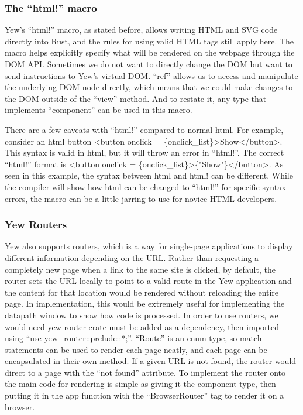 \documentclass[
    parskip=half,
    fontsize=12pt,
    titlepage=firstiscover,
    toc=bibliography,
    numbers=endperiod
]{scrartcl}
\begin{document}
\subsubsection{The ``html!'' macro}
\label{subsec:html-macro}

Yew's ``html!'' macro, as stated before, allows writing HTML and SVG
code directly into Rust, and the rules for using valid HTML tags still
apply here. The macro helps explicitly specify what will be rendered on
the webpage through the DOM API. Sometimes we do not want to directly
change the DOM but want to send instructions to Yew's virtual DOM.
``ref'' allows us to access and manipulate the underlying DOM node
directly, which means that we could make changes to the DOM outside of
the ``view'' method. And to restate it, any type that implements
``component'' can be used in this macro.

There are a few caveats with ``html!'' compared to normal html. For
example, consider an html button \textless button onclick =
\{onclick\_list\}\textgreater Show\textless/button\textgreater. This
syntax is valid in html, but it will throw an error in ``html!''. The
correct ``html!'' format is \textless button onclick =
\{onclick\_list\}\textgreater\{"Show"\}\textless/button\textgreater. As
seen in this example, the syntax between html and html! can be
different. While the compiler will show how html can be changed to
``html!'' for specific syntax errors, the macro can be a little jarring
to use for novice HTML developers.

\subsubsection{Yew Routers}

Yew also supports routers, which is a way for single-page applications
to display different information depending on the URL. Rather than
requesting a completely new page when a link to the same site is
clicked, by default, the router sets the URL locally to point to a valid
route in the Yew application and the content for that location would be
rendered without reloading the entire page. In implementation, this
would be extremely useful for implementing the datapath window to show
how code is processed. In order to use routers, we would need yew-router
crate must be added as a dependency, then imported using ``use
yew\_router::prelude::*;''. ``Route'' is an enum type, so match
statements can be used to render each page neatly, and each page can be
encapsulated in their own method. If a given URL is not found, the
router would direct to a page with the ``not found'' attribute. To
implement the router onto the main code for rendering is simple as
giving it the component type, then putting it in the app function with
the ``BrowserRouter'' tag to render it on a browser.
\end{document}
